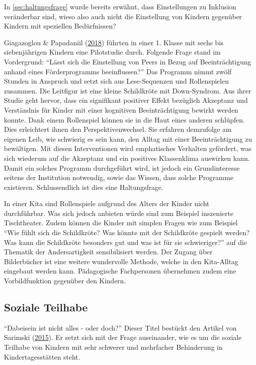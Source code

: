 \documentclass[
  ngerman,
  11pt,
  paper=a4,
  twoside,
  titlepage=true,
  openright,
  abstract=on,
  toc=listofnumbered,
  numbers=noenddot,
  chapterprefix=true,
  headings=optiontohead,
  svgnames,
  dvipsnames]{scrreprt}
\begin{document}
In \cref{sec:haltungsfrage} wurde bereits erwähnt, dass Einstellungen zu
Inklusion veränderbar sind, wieso also auch nicht die Einstellung von
Kindern gegenüber Kindern mit speziellen Bedürfnissen?

Giagazoglou \& Papadaniil
(\protect\hyperlink{ref-storytelllingprogram}{2018}) führten in einer 1.
Klasse mit sechs bis siebenjährigen Kindern eine Pilotstudie durch.
Folgende Frage stand im Vordergrund: “Lässt sich die Einstellung von
Peers in Bezug auf Beeinträchtigung anhand eines Förderprogramms
beeinflussen?” Das Programm nimmt zwölf Stunden in Anspruch und setzt
sich aus Lese-Sequenzen und Rollenspielen zusammen. Die Leitfigur ist
eine kleine Schildkröte mit Down-Syndrom. Aus ihrer Studie geht hervor,
dass ein signifikant positiver Effekt bezüglich Akzeptanz und
Verständnis für Kinder mit einer kognitiven Beeinträchtigung bewirkt
werden konnte. Dank einem Rollenspiel können sie in die Haut eines
anderen schlüpfen. Dies erleichtert ihnen den Perspektivenwechsel. Sie
erfahren demzufolge am eigenen Leib, wie schwierig es sein kann, den
Alltag mit einer Beeinträchtigung zu bewältigen. Mit diesen
Interventionen wird emphatisches Verhalten gefördert, was sich wiederum
auf die Akzeptanz und ein positives Klassenklima auswirken kann. Damit
ein solches Programm durchgeführt wird, ist jedoch ein Grundinteresse
seitens der Institution notwendig, sowie das Wissen, dass solche
Programme existieren. Schlussendlich ist dies eine Haltungsfrage.

In einer Kita sind Rollenspiele aufgrund des Alters der Kinder nicht
durchführbar. Was sich jedoch anbieten würde sind zum Beispiel
inszenierte Tischtheater. Zudem können die Kinder mit simplen Fragen wie
zum Beispiel “Wie fühlt sich die Schildkröte? Was könnte mit der
Schildkröte gespielt werden? Was kann die Schildkröte besonders gut und
was ist für sie schwieriger?” auf die Thematik der Andersartigkeit
sensibilisiert werden. Der Zugang über Bilderbücher ist eine weitere
wundervolle Methode, welche in den Kita-Alltag eingebaut werden kann.
Pädagogische Fachpersonen übernehmen zudem eine Vorbildfunktion
gegenüber den Kindern.

\hypertarget{sec:sozialeteilhabe}{%
\subsection{Soziale Teilhabe}\label{sec:sozialeteilhabe}}

“Dabeisein ist nicht alles - oder doch?” Dieser Titel bestückt den
Artikel von Sarimski
(\protect\hyperlink{ref-dabeiseinIstNichtAllesOderDoch}{2015}). Er setzt
sich mit der Frage auseinander, wie es um die soziale Teilhabe von
Kindern mit sehr schwerer und mehrfacher Behinderung in
Kindertagesstätten steht.
\end{document}
